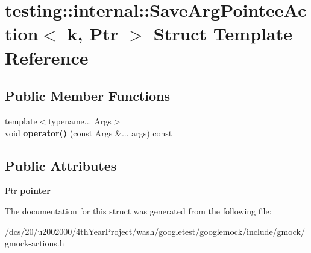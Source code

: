 \hypertarget{structtesting_1_1internal_1_1SaveArgPointeeAction}{}\section{testing\+:\+:internal\+:\+:Save\+Arg\+Pointee\+Action$<$ k, Ptr $>$ Struct Template Reference}
\label{structtesting_1_1internal_1_1SaveArgPointeeAction}
\subsection*{Public Member Functions}
\begin{DoxyCompactItemize}
\item 
\mbox{\label{structtesting_1_1internal_1_1SaveArgPointeeAction_a42df5a468562cdade19c50a17fce3221}} 
{\footnotesize template$<$typename... Args$>$ }\\void {\bfseries operator()} (const Args \&... args) const
\end{DoxyCompactItemize}
\subsection*{Public Attributes}
\begin{DoxyCompactItemize}
\item 
\mbox{\label{structtesting_1_1internal_1_1SaveArgPointeeAction_a331d4e06b3d8744bbb3745c3158c5d51}} 
Ptr {\bfseries pointer}
\end{DoxyCompactItemize}


The documentation for this struct was generated from the following file\+:\begin{DoxyCompactItemize}
\item 
/dcs/20/u2002000/4th\+Year\+Project/wash/googletest/googlemock/include/gmock/gmock-\/actions.\+h\end{DoxyCompactItemize}
